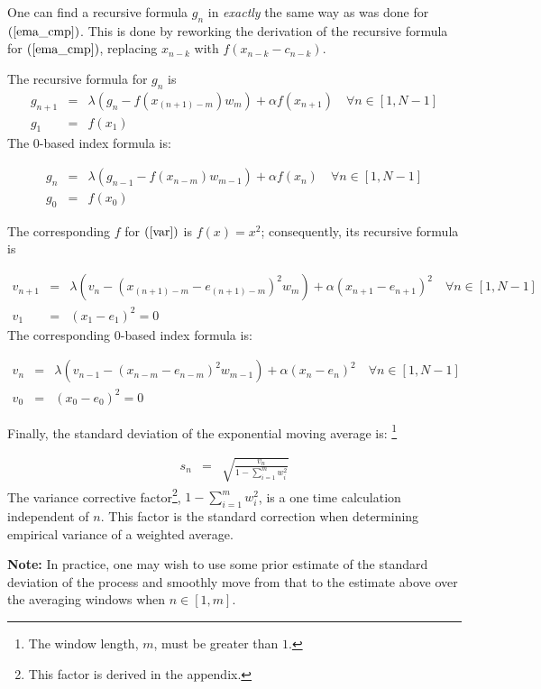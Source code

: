 \documentclass{article}
\begin{document}
One can find a recursive formula $g_n$ in {\em exactly\/} the same way as
was done for $(\ref{ema_cmp})$. This is done by reworking the derivation of 
the recursive formula for $(\ref{ema_cmp})$, replacing $x_{n-k}$ with $f(x_{n-k} - c_{n-k})$.

The recursive formula for $g_n$ is
\begin{eqnarray}
    g_{n+1} &=&  \lambda \left( g_{n} - f(x_{(n+1)-m}) w_m \right) + \alpha f(x_{n+1})   \quad \forall n \in [1, N-1] \\
    g_1     &=&  f(x_1) 
\end{eqnarray}
The 0-based index formula is:

\begin{eqnarray}
    g_{n} &=&  \lambda \left( g_{n-1} - f(x_{n-m}) w_{m-1} \right) + \alpha f(x_{n}) \quad \forall n \in [1, N-1] \\
    g_0   &=&  f(x_0) 
\end{eqnarray}

The corresponding $f$ for $(\ref{var})$ is $f(x) = x^2$; 
consequently, its recursive formula is 

\begin{eqnarray}
    v_{n+1} &=& \lambda \left( v_n -  ( x_{(n+1)-m} - e_{(n+1)-m} )^2 w_m \right) + \alpha( x_{n+1} - e_{n+1} )^2 \quad \forall n \in [1, N-1] \\
    v_1     &=&  (x_1 - e_1)^2 = 0 
\end{eqnarray}
The corresponding 0-based index formula is:

\begin{eqnarray}
    v_{n} &=& \lambda \left( v_{n-1} - ( x_{n-m} - e_{n-m} )^2 w_{m-1}\right) + \alpha ( x_{n} - e_{n} )^2 \quad \forall n \in [1, N-1] \\
    v_0   &=& (x_0 - e_0)^2 = 0 
\end{eqnarray}

Finally, the standard deviation of the exponential moving average is:%
\footnote{The window length, $m$, must be greater than $1$.}

\begin{eqnarray}
    s_{n} &=& \sqrt{\frac{v_n}{1 - \sum_{i=1}^m w_i^2}}  
\end{eqnarray}
The variance corrective factor\footnote{This factor is derived in the appendix.}, $1 - \sum_{i=1}^m w_i^2$,
is a one time calculation independent of $n$. This factor is the standard 
correction when determining empirical variance of a weighted average.

{\bf Note:\/} In practice, one may wish to use some prior estimate of the standard deviation of the process
and smoothly move from that to the estimate above over the averaging windows when $n \in [1, m]$.
\end{document}
